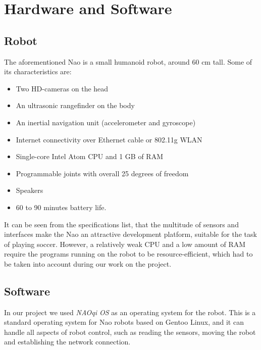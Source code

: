 \chapter{Hardware and Software}

\section{Robot}

The aforementioned Nao \cite{nao} is a small humanoid robot, around 60
cm tall. Some of its characteristics are:

\begin{itemize}

\item Two HD-cameras on the head

\item An ultrasonic rangefinder on the body

\item An inertial navigation unit (accelerometer and gyroscope)

\item Internet connectivity over Ethernet cable or 802.11g WLAN

\item Single-core Intel Atom CPU and 1 GB of RAM

\item Programmable joints with overall 25 degrees of freedom

\item Speakers

\item 60 to 90 minutes battery life.

\end{itemize}

It can be seen from the specifications list, that the multitude of sensors and
interfaces make the Nao an attractive development platform, suitable for the task
of playing soccer. However, a relatively weak CPU and a low amount of RAM require
the programs running on the robot to be resource-efficient, which had to be
taken into account during our work on the project.

\section{Software}

In our project we used \textit{NAOqi OS} as an operating system for the robot.
This is a standard operating system for Nao robots based on Gentoo Linux, and
it can handle all aspects of robot control, such as reading the sensors, moving
the robot and establishing the network connection.

